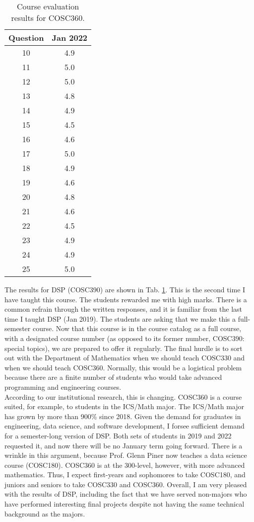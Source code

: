 \documentclass[../../main.tex]{subfiles}
\begin{document}
\begin{table}
\footnotesize
\centering
\begin{tabular}{| c | c |}
\hline
\hline
Question & Jan 2022 \\ \hline
10 & 4.9 \\ \hline
11 & 5.0 \\ \hline
12 & 5.0 \\ \hline
13 & 4.8 \\ \hline
14 & 4.9 \\ \hline
15 & 4.5 \\ \hline
16 & 4.6 \\ \hline
17 & 5.0 \\ \hline
18 & 4.9 \\ \hline
19 & 4.6 \\ \hline
20 & 4.8 \\ \hline
21 & 4.6 \\ \hline
22 & 4.5 \\ \hline
23 & 4.9 \\ \hline
24 & 4.9 \\ \hline
25 & 5.0 \\ \hline
\hline
\end{tabular}
\caption{\label{tab:eval_dsp} Course evaluation results for COSC360.}
\end{table}

The results for DSP (COSC390) are shown in Tab. \ref{tab:eval_dsp}.  This is the second time I have taught this course.  The students rewarded me with high marks.  There is a common refrain through the written responses, and it is familiar from the last time I taught DSP (Jan 2019).  The students are asking that we make this a full-semester course.  Now that this course is in the course catalog as a full course, with a designated course number (as opposed to its former number, COSC390: special topics), we are prepared to offer it regularly.  The final hurdle is to sort out with the Department of Mathematics when we should teach COSC330 and when we should teach COSC360.  Normally, this would be a logistical problem because there are a finite number of students who would take advanced programming and engineering courses.
\\
\vspace{0.25cm}
According to our institutional research, this is changing.  COSC360 is a course suited, for example, to students in the ICS/Math major.  The ICS/Math major has grown by more than 900\% since 2018.  Given the demand for graduates in engineering, data science, and software development, I forsee sufficient demand for a semester-long version of DSP.  Both sets of students in 2019 and 2022 requested it, and now there will be no January term going forward.  There is a wrinkle in this argument, because Prof. Glenn Piner now teaches a data science course (COSC180).  COSC360 is at the 300-level, however, with more advanced mathematics.  Thus, I expect first-years and sophomores to take COSC180, and juniors and seniors to take COSC330 and COSC360.  Overall, I am very pleased with the results of DSP, including the fact that we have served non-majors who have performed interesting final projects despite not having the same technical background as the majors.
\end{document}
